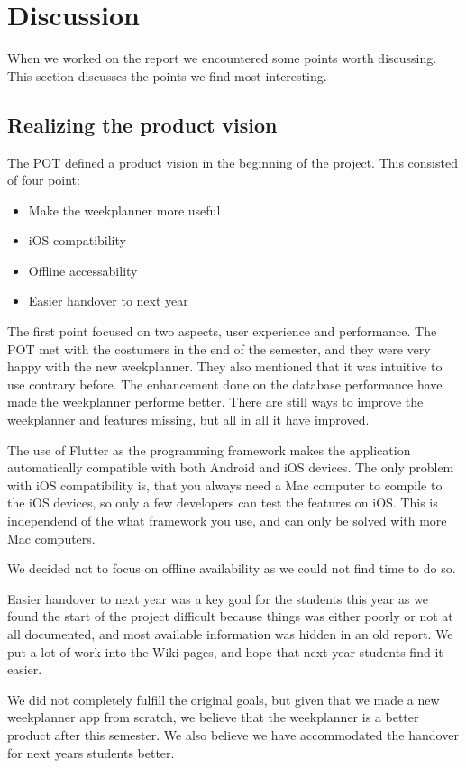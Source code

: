 \section{Discussion}

When we worked on the report we encountered some points worth discussing. This section discusses the points we find most interesting. 

\subsection{Realizing the product vision}
The \gls{POT} defined a product vision in the beginning of the project. This consisted of four point:
\begin{itemize}
    \item Make the weekplanner more useful
    \item iOS compatibility
    \item Offline accessability
    \item Easier handover to next year
\end{itemize}
The first point focused on two aspects, user experience and performance. The \gls{POT} met with the costumers in the end of the semester, and they were very happy with the new weekplanner. They also mentioned that it was intuitive to use contrary before. The enhancement done on the database performance have made the weekplanner performe better. There are still ways to improve the weekplanner and features missing, but all in all it have improved.

The use of Flutter as the programming framework makes the application automatically compatible with both Android and iOS devices. The only problem with iOS compatibility is, that you always need a Mac computer to compile to the iOS devices, so only a few developers can test the features on iOS. This is independend of the what framework you use, and can only be solved with more Mac computers.

We decided not to focus on offline availability as we could not find time to do so.

Easier handover to next year was a key goal for the students this year as we found the start of the project difficult because things was either poorly or not at all documented, and most available information was hidden in an old report. We put a lot of work into the Wiki pages, and hope that next year students find it easier.

We did not completely fulfill the original goals, but given that we made a new weekplanner app from scratch, we believe that the weekplanner is a better product after this semester. We also believe we have accommodated the handover for next years students better.

